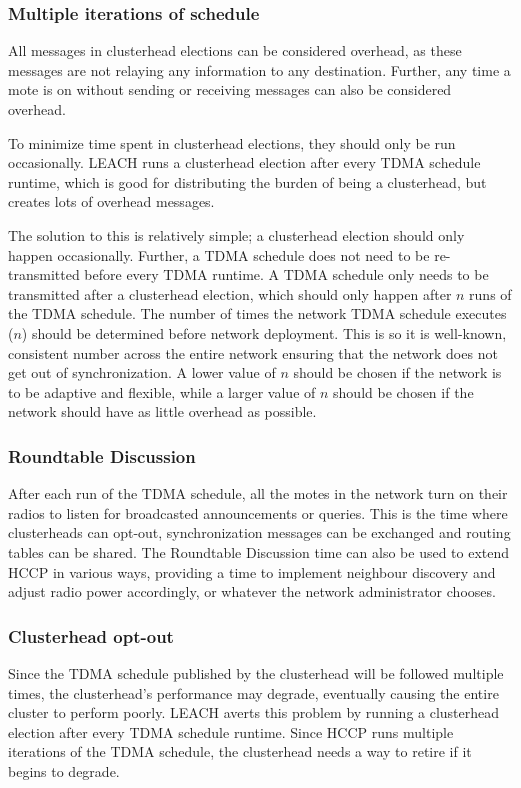 \subsubsection* {Multiple iterations of schedule}
	All messages in clusterhead elections can be considered overhead, as these messages are not
	relaying any information to any destination. Further, 
	any time a mote is on without sending or receiving messages
	can also be considered overhead.
	
	To minimize time spent in clusterhead elections, they should only be run
	occasionally. LEACH runs a clusterhead election after every TDMA schedule runtime,
	which is good for distributing the burden of being a clusterhead, but creates
	lots of overhead messages. 
	
	The solution to this is relatively simple; a clusterhead election should only happen 
	occasionally. Further, a TDMA schedule does not need to be re-transmitted before
	every TDMA runtime. A TDMA schedule only needs to be transmitted after a 
	clusterhead election, which should only happen after $n$ runs of 
	the TDMA schedule. The number of times the network TDMA schedule executes ($n$) should be determined before
	network deployment. This is so it is well-known, consistent number across the entire network
	ensuring that the network does not get out of synchronization. A lower
	value of $n$ should be chosen if the network is to be adaptive and flexible, while
	a larger value of $n$ should be chosen if the network should have as little overhead as possible.

\subsubsection* {Roundtable Discussion}
	After each run of the TDMA schedule, all the motes in the network turn on 
	their radios to listen for broadcasted announcements or queries.
	This is the time where clusterheads can opt-out, synchronization messages
	can be exchanged and routing tables can be shared. The Roundtable Discussion 
	time can also be used to extend HCCP in various ways, providing a
	time to implement neighbour discovery and adjust radio power accordingly, or whatever
	the network administrator chooses.



\subsubsection* {Clusterhead opt-out}
\label{optout}
	Since the TDMA schedule published by the clusterhead will be followed 
	multiple times, the clusterhead's performance may degrade, eventually causing
	the entire cluster to perform poorly. LEACH averts this problem by running 
	a clusterhead election after every TDMA schedule runtime.
	Since HCCP runs multiple iterations of the TDMA schedule, the clusterhead needs a
	way to retire if it begins to degrade.

